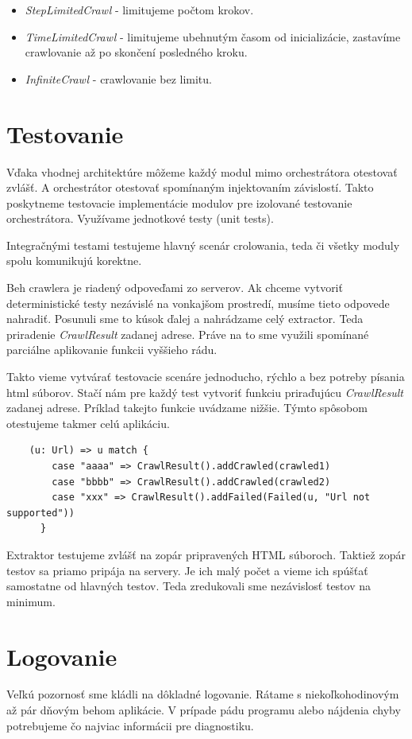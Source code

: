 \begin{itemize}
    \item \textit{StepLimitedCrawl} - limitujeme počtom krokov.
    \item \textit{TimeLimitedCrawl} - limitujeme ubehnutým časom od inicializácie, zastavíme crawlovanie až po skončení posledného kroku. 
    \item \textit{InfiniteCrawl} - crawlovanie bez limitu.
\end{itemize}


\section{Testovanie}
Vďaka vhodnej architektúre môžeme každý modul mimo orchestrátora otestovať zvlášť. A orchestrátor otestovať spomínaným injektovaním závislostí. Takto poskytneme testovacie implementácie modulov pre izolované testovanie orchestrátora. Využívame jednotkové testy (unit tests). 

Integračnými testami testujeme hlavný scenár crolowania, teda či všetky moduly spolu komunikujú korektne. 

Beh crawlera je riadený odpoveďami zo serverov. Ak chceme vytvoriť deterministické testy nezávislé na vonkajšom prostredí, musíme tieto odpovede nahradiť. Posunuli sme to kúsok ďalej a nahrádzame celý extractor. Teda priradenie \textit{CrawlResult} zadanej adrese. Práve na to sme využili spomínané parciálne aplikovanie funkcii vyššieho rádu.

Takto vieme vytvárať testovacie scenáre jednoducho, rýchlo a bez potreby písania html súborov. Stačí nám pre každý test vytvoriť funkciu priraďujúcu \textit{CrawlResult} zadanej adrese. Príklad takejto funkcie uvádzame nižšie. Týmto spôsobom otestujeme takmer celú aplikáciu.

\begin{lstlisting}
    (u: Url) => u match {
        case "aaaa" => CrawlResult().addCrawled(crawled1)
        case "bbbb" => CrawlResult().addCrawled(crawled2)
        case "xxx" => CrawlResult().addFailed(Failed(u, "Url not supported"))
      }
\end{lstlisting}


Extraktor testujeme zvlášť na zopár pripravených HTML súboroch. Taktiež zopár testov sa priamo pripája na servery. Je ich malý počet a vieme ich spúšťať samostatne od hlavných testov. Teda zredukovali sme nezávislosť testov na minimum. 

\section{Logovanie} \label{c:impl:logging}
Veľkú pozornosť sme kládli na dôkladné logovanie. Rátame s niekoľkohodinovým až pár dňovým behom aplikácie. V prípade pádu programu alebo nájdenia chyby potrebujeme čo najviac informácii pre diagnostiku.

